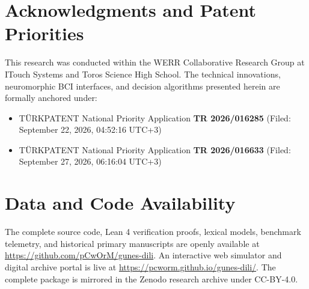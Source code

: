 \documentclass[11pt,letterpaper]{article}
\begin{document}
\section*{Acknowledgments and Patent Priorities}

This research was conducted within the WERR Collaborative Research Group at ITouch Systems and Toros Science High School. 
The technical innovations, neuromorphic BCI interfaces, and decision algorithms presented herein are formally anchored under:
\begin{itemize}
    \item T\"{U}RKPATENT National Priority Application \textbf{TR 2026/016285} (Filed: September 22, 2026, 04:52:16 UTC+3)
    \item T\"{U}RKPATENT National Priority Application \textbf{TR 2026/016633} (Filed: September 27, 2026, 06:16:04 UTC+3)
\end{itemize}

\section*{Data and Code Availability}

The complete source code, Lean 4 verification proofs, lexical models, benchmark telemetry, and historical primary manuscripts are openly available at \url{https://github.com/pCwOrM/gunes-dili}. An interactive web simulator and digital archive portal is live at \url{https://pcworm.github.io/gunes-dili/}. The complete package is mirrored in the Zenodo research archive under CC-BY-4.0.
\end{document}
